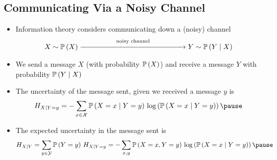 \begin{slide}
\section[-1]{Communicating Via a Noisy Channel}

\begin{PauseHighLight}\small
  \begin{itemize}
  \item Information theory considers communicating down a (noisy)
    channel
    \begin{align*}
      X \sim \Prob{X}  \stackrel{\text{noisy
      channel}}{\xrightarrow{\hspace*{5cm}}} Y \sim \Prob{Y\mid X}
    \end{align*}
  \item  We send a message $X$ (with probability $\mathbb{P}\left( X \right)$) and
    receive a message $Y$ with probability $\mathbb{P}\left( Y\mid X \right)$\pause
  \item The uncertainty of the message sent, given we received a
    message $y$ is
    \begin{align*}
      H_{X|Y=y} = - \sum_{x\in\mathcal{X}} \Prob{X=x \mid Y=y} \, \logg{\Prob{X=x \mid Y=y}}\pause
    \end{align*}
  \item The expected uncertainty in the message sent is
    \begin{align*}
      H_{X|Y} = \sum_{y\in\mathcal{Y}} \Prob{Y=y} \, H_{X|Y=y}
      = - \sum_{x,y} \Prob{X=x,Y=y} \, \logg{\Prob{X=x \mid Y=y}}\pause
    \end{align*}
  \end{itemize}
\end{PauseHighLight}

\end{slide}


